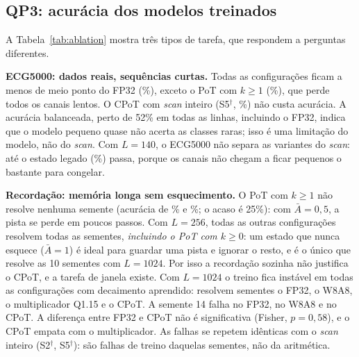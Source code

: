 \documentclass[12pt]{article}
\begin{document}
\subsection{QP3: acurácia dos modelos treinados}

\begin{table}[htb]
\centering
\caption{Acurácia de teste (\%, média $\pm$ desvio padrão entre sementes) no ECG5000 e na janela; na recordação, sementes que resolvem a tarefa (acurácia $>90\%$) sobre sementes treinadas. S2, S4 e S5 têm 10 sementes na janela e com $L=1024$, e S0 e S1 têm 10 com $L=1024$; as demais células têm 5 (3 com $L=1024$). $^\dagger$/$^\ddagger$: o mesmo modelo treinado, avaliado com o \emph{scan} inteiro bit-exato do RTL (configuração proposta e legada).}
\label{tab:ablation}
\footnotesize
\setlength{\tabcolsep}{3pt}
\resizebox{\textwidth}{!}{%
}
\end{table}

A Tabela~\ref{tab:ablation} mostra três tipos de tarefa, que respondem a perguntas diferentes.

\textbf{ECG5000: dados reais, sequências curtas.} Todas as configurações ficam a menos de meio ponto do FP32 (\%), exceto o PoT com $k\geq1$ (\%), que perde todos os canais lentos. O CPoT com \emph{scan} inteiro (S5$^\dagger$, \%) não custa acurácia. A acurácia balanceada, perto de 52\% em todas as linhas, incluindo o FP32, indica que o modelo pequeno quase não acerta as classes raras; isso é uma limitação do modelo, não do \emph{scan}. Com $L=140$, o ECG5000 não separa as variantes do \emph{scan}: até o estado legado (\%) passa, porque os canais não chegam a ficar pequenos o bastante para congelar.

\textbf{Recordação: memória longa sem esquecimento.} O PoT com $k\geq1$ não resolve nenhuma semente (acurácia de \% e \%; o acaso é 25\%): com $\bar{A}=0{,}5$, a pista se perde em poucos passos. Com $L=256$, todas as outras configurações resolvem todas as sementes, \emph{incluindo o PoT com $k\geq0$}: um estado que nunca esquece ($\bar{A}=1$) é ideal para guardar uma pista e ignorar o resto, e é o único que resolve as 10 sementes com $L=1024$. Por isso a recordação sozinha não justifica o CPoT, e a tarefa de janela existe. Com $L=1024$ o treino fica instável em todas as configurações com decaimento aprendido: resolvem  sementes o FP32,  o W8A8,  o multiplicador Q1.15 e  o CPoT. A semente 14 falha no FP32, no W8A8 e no CPoT. A diferença entre FP32 e CPoT não é significativa (Fisher, $p=0{,}58$), e o CPoT empata com o multiplicador. As falhas se repetem idênticas com o \emph{scan} inteiro (S2$^\dagger$, S5$^\dagger$): são falhas de treino daquelas sementes, não da aritmética.
\end{document}
